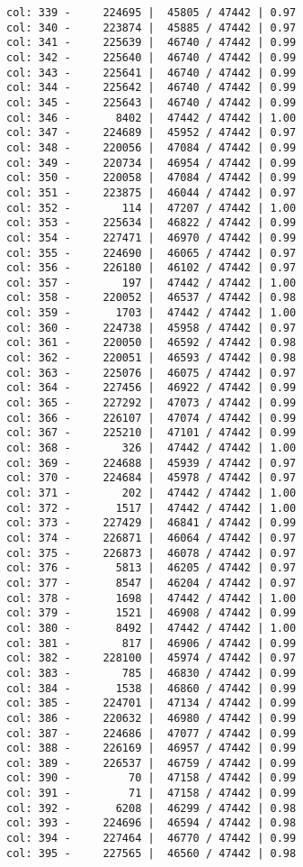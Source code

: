 \documentclass[11pt]{article}
\begin{document}
\begin{Verbatim}[commandchars=\\\{\}]
col: 339 -     224695 |  45805 / 47442 | 0.97
col: 340 -     223874 |  45885 / 47442 | 0.97
col: 341 -     225639 |  46740 / 47442 | 0.99
col: 342 -     225640 |  46740 / 47442 | 0.99
col: 343 -     225641 |  46740 / 47442 | 0.99
col: 344 -     225642 |  46740 / 47442 | 0.99
col: 345 -     225643 |  46740 / 47442 | 0.99
col: 346 -       8402 |  47442 / 47442 | 1.00
col: 347 -     224689 |  45952 / 47442 | 0.97
col: 348 -     220056 |  47084 / 47442 | 0.99
col: 349 -     220734 |  46954 / 47442 | 0.99
col: 350 -     220058 |  47084 / 47442 | 0.99
col: 351 -     223875 |  46044 / 47442 | 0.97
col: 352 -        114 |  47207 / 47442 | 1.00
col: 353 -     225634 |  46822 / 47442 | 0.99
col: 354 -     227471 |  46970 / 47442 | 0.99
col: 355 -     224690 |  46065 / 47442 | 0.97
col: 356 -     226180 |  46102 / 47442 | 0.97
col: 357 -        197 |  47442 / 47442 | 1.00
col: 358 -     220052 |  46537 / 47442 | 0.98
col: 359 -       1703 |  47442 / 47442 | 1.00
col: 360 -     224738 |  45958 / 47442 | 0.97
col: 361 -     220050 |  46592 / 47442 | 0.98
col: 362 -     220051 |  46593 / 47442 | 0.98
col: 363 -     225076 |  46075 / 47442 | 0.97
col: 364 -     227456 |  46922 / 47442 | 0.99
col: 365 -     227292 |  47073 / 47442 | 0.99
col: 366 -     226107 |  47074 / 47442 | 0.99
col: 367 -     225210 |  47101 / 47442 | 0.99
col: 368 -        326 |  47442 / 47442 | 1.00
col: 369 -     224688 |  45939 / 47442 | 0.97
col: 370 -     224684 |  45978 / 47442 | 0.97
col: 371 -        202 |  47442 / 47442 | 1.00
col: 372 -       1517 |  47442 / 47442 | 1.00
col: 373 -     227429 |  46841 / 47442 | 0.99
col: 374 -     226871 |  46064 / 47442 | 0.97
col: 375 -     226873 |  46078 / 47442 | 0.97
col: 376 -       5813 |  46205 / 47442 | 0.97
col: 377 -       8547 |  46204 / 47442 | 0.97
col: 378 -       1698 |  47442 / 47442 | 1.00
col: 379 -       1521 |  46908 / 47442 | 0.99
col: 380 -       8492 |  47442 / 47442 | 1.00
col: 381 -        817 |  46906 / 47442 | 0.99
col: 382 -     228100 |  45974 / 47442 | 0.97
col: 383 -        785 |  46830 / 47442 | 0.99
col: 384 -       1538 |  46860 / 47442 | 0.99
col: 385 -     224701 |  47134 / 47442 | 0.99
col: 386 -     220632 |  46980 / 47442 | 0.99
col: 387 -     224686 |  47077 / 47442 | 0.99
col: 388 -     226169 |  46957 / 47442 | 0.99
col: 389 -     226537 |  46759 / 47442 | 0.99
col: 390 -         70 |  47158 / 47442 | 0.99
col: 391 -         71 |  47158 / 47442 | 0.99
col: 392 -       6208 |  46299 / 47442 | 0.98
col: 393 -     224696 |  46594 / 47442 | 0.98
col: 394 -     227464 |  46770 / 47442 | 0.99
col: 395 -     227565 |  46560 / 47442 | 0.98

\end{Verbatim}
\end{document}
